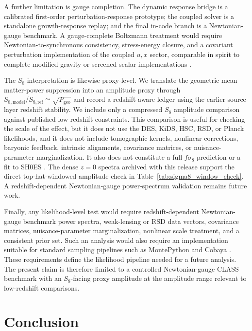 ﻿\documentclass[11pt,prd,preprint,nofootinbib,amsmath,amssymb]{revtex4-2}
\begin{document}
A further limitation is gauge completion. The dynamic response bridge is a
calibrated first-order perturbation-response prototype; the coupled solver is a
standalone growth-response replay; and the final in-code branch is a
Newtonian-gauge benchmark. A gauge-complete Boltzmann treatment would
require Newtonian-to-synchronous consistency, stress-energy closure, and a
covariant perturbation implementation of the coupled $u,x$ sector, comparable
in spirit to complete modified-gravity or screened-scalar implementations
\cite{Khoury2004,Linder2005,HuSawicki2007,Noller2021}.

The $S_8$ interpretation is likewise proxy-level. We translate the
geometric mean matter-power suppression into an amplitude proxy through
$S_{8,\mathrm{model}}/S_{8,\mathrm{ref}}\simeq\sqrt{P_{\mathrm{geo}}}$ and record
a redshift-aware ledger using the earlier source-layer redshift stability. We
include only a compressed $S_8$ amplitude comparison against published
low-redshift constraints. This comparison is useful for checking the scale of
the effect, but it does not use the DES, KiDS, HSC, RSD, or Planck
\cite{Planck2018} likelihoods, and it does not include tomographic kernels,
nonlinear corrections, baryonic feedback, intrinsic alignments, covariance
matrices, or nuisance-parameter marginalization. It also does not constitute a
full $f\sigma_8$ prediction or a fit to SH0ES \cite{SH0ES}.
The dense $z=0$ spectra archived with this release support the direct
top-hat-windowed amplitude check in Table~\ref{tab:sigma8_window_check}. A
redshift-dependent Newtonian-gauge power-spectrum validation remains future
work.

Finally, any likelihood-level test would require redshift-dependent
Newtonian-gauge benchmark
power spectra, weak-lensing or RSD data vectors, covariance matrices,
nuisance-parameter marginalization, nonlinear scale treatment, and a consistent
prior set. Such an analysis would also require an implementation suitable for
standard sampling pipelines such as MontePython and Cobaya
\cite{MontePython,Cobaya}. These requirements define the likelihood pipeline
needed for a future analysis. The present claim is therefore limited to a controlled
Newtonian-gauge CLASS benchmark with an $S_8$-facing proxy amplitude at the
amplitude range relevant to low-redshift comparisons.

\section{Conclusion}
\end{document}
